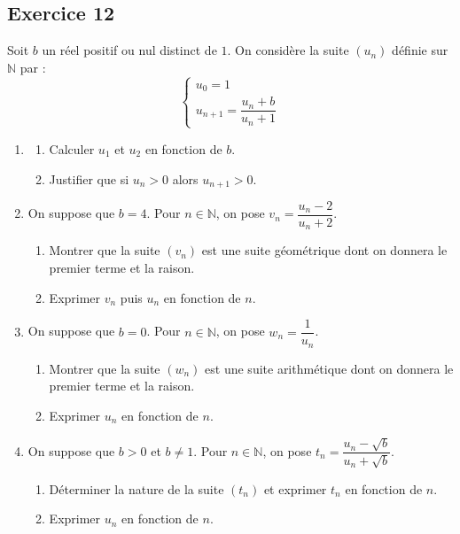 \documentclass[11pt,a4paper]{article}
\newcommand{\N}{\mathbb{N}}
\begin{document}
\subsection*{Exercice 12}
Soit $b$ un réel positif ou nul distinct de $1$. On considère la suite $(u_n)$ définie sur $\N$ par :
\[
\begin{cases}
u_0 = 1\\
u_{n+1} = \dfrac{u_n + b}{u_n + 1}
\end{cases}
\]
\begin{enumerate}
    \item
    \begin{enumerate}
        \item Calculer $u_1$ et $u_2$ en fonction de $b$.
        \item Justifier que si $u_n > 0$ alors $u_{n+1} > 0$.
    \end{enumerate}
    \item On suppose que $b = 4$. Pour $n \in \N$, on pose $v_n = \dfrac{u_n - 2}{u_n + 2}$.
    \begin{enumerate}
        \item Montrer que la suite $(v_n)$ est une suite géométrique dont on donnera le premier terme et la raison.
        \item Exprimer $v_n$ puis $u_n$ en fonction de $n$.
    \end{enumerate}
    \item On suppose que $b = 0$. Pour $n \in \N$, on pose $w_n = \dfrac{1}{u_n}$.
    \begin{enumerate}
        \item Montrer que la suite $(w_n)$ est une suite arithmétique dont on donnera le premier terme et la raison.
        \item Exprimer $u_n$ en fonction de $n$.
    \end{enumerate}
    \item On suppose que $b > 0$ et $b \ne 1$. Pour $n \in \N$, on pose $t_n = \dfrac{u_n - \sqrt{b}}{u_n + \sqrt{b}}$.
    \begin{enumerate}
        \item Déterminer la nature de la suite $(t_n)$ et exprimer $t_n$ en fonction de $n$.
        \item Exprimer $u_n$ en fonction de $n$.
    \end{enumerate}
\end{enumerate}
\end{document}
